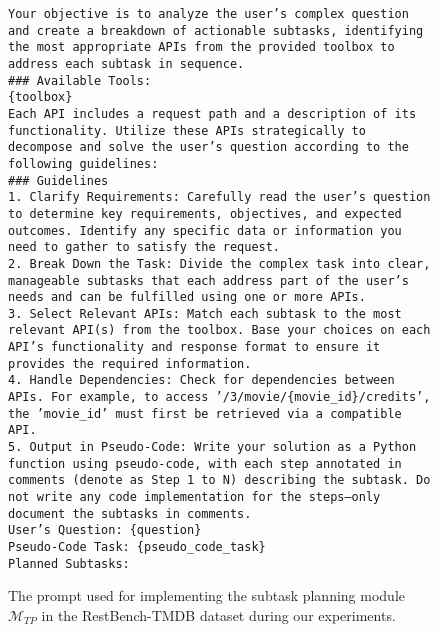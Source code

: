 \begin{figure*}[ht]
\centering
\begin{tcolorbox}[colback=white!95!blue, colframe=blue!40!, title=Prompt for Subtask Planning Module $\mathcal{M}_{TP}$, width=\textwidth]
\small
\texttt{Your objective is to analyze the user's complex question and create a breakdown of actionable subtasks, identifying the most appropriate APIs from the provided toolbox to address each subtask in sequence.}\\

\texttt{\#\#\# Available Tools:} \\
\texttt{\{toolbox\}}\\

\texttt{Each API includes a request path and a description of its functionality. Utilize these APIs strategically to decompose and solve the user's question according to the following guidelines:}\\

\texttt{\#\#\# Guidelines}\\
\texttt{1. Clarify Requirements: Carefully read the user's question to determine key requirements, objectives, and expected outcomes. Identify any specific data or information you need to gather to satisfy the request.}\\
\texttt{2. Break Down the Task: Divide the complex task into clear, manageable subtasks that each address part of the user's needs and can be fulfilled using one or more APIs.}\\
\texttt{3. Select Relevant APIs: Match each subtask to the most relevant API(s) from the toolbox. Base your choices on each API's functionality and response format to ensure it provides the required information.}\\
\texttt{4. Handle Dependencies: Check for dependencies between APIs. For example, to access '\//3\//movie\//\{movie\_id\}\//credits', the 'movie\_id' must first be retrieved via a compatible API.}\\
\texttt{5. Output in Pseudo-Code: Write your solution as a Python function using pseudo-code, with each step annotated in comments (denote as Step 1 to N) describing the subtask. Do not write any code implementation for the steps—only document the subtasks in comments.}\\

\texttt{User's Question: \{question\}}\\
\texttt{Pseudo-Code Task: \{pseudo\_code\_task\}}\\
\texttt{Planned Subtasks:}
\end{tcolorbox}
\caption{The prompt used for implementing the subtask planning module $\mathcal{M}_{TP}$ in the RestBench-TMDB dataset during our experiments.}
\label{fig:subtask_planning_prompt}
\end{figure*}